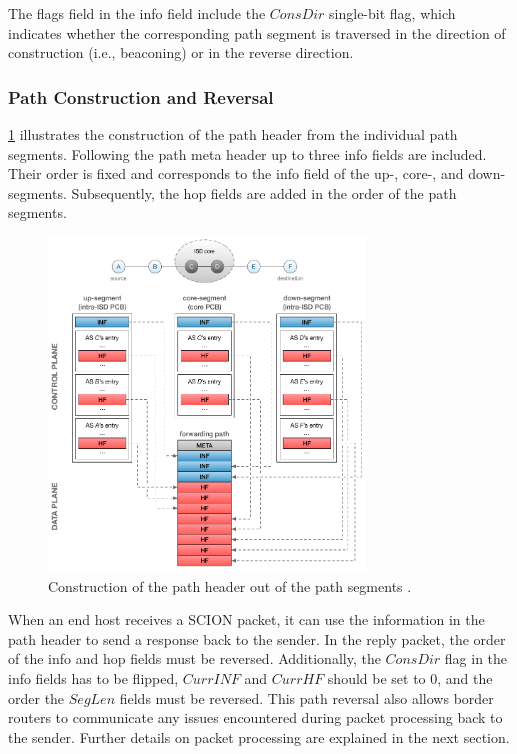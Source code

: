The flags field in the info field include the $ConsDir$ single-bit flag, which indicates whether the corresponding path segment is traversed in the direction of construction (i.e., beaconing) or in the reverse direction.

\subsubsection{Path Construction and Reversal}

\cref{fig:scion_path_header_contruction} illustrates the construction of the path header from the individual path segments.
Following the path meta header up to three info fields are included.
Their order is fixed and corresponds to the info field of the up-, core-, and down-segments.
Subsequently, the hop fields are added in the order of the path segments.

\begin{figure}[h]
    \centering
    \includegraphics[width=0.75\textwidth]{figures/scion_path_header_construction.png}
    \caption{Construction of the path header out of the path segments \cite[Section 5.4]{Perrig2022}.}
    \label{fig:scion_path_header_contruction}
\end{figure}

When an end host receives a SCION packet, it can use the information in the path header to send a response back to the sender.
In the reply packet, the order of the info and hop fields must be reversed.
Additionally, the $ConsDir$ flag in the info fields has to be flipped, $CurrINF$ and $CurrHF$ should be set to 0, and the order the $SegLen$ fields must be reversed.
This path reversal also allows border routers to communicate any issues encountered during packet processing back to the sender.
Further details on packet processing are explained in the next section.


